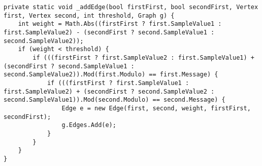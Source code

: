 \begin{lstlisting}[firstnumber=482,label=lst:newAddEdge, caption={The improved \lstinline|_addEdge| method.}]
private static void _addEdge(bool firstFirst, bool secondFirst, Vertex first, Vertex second, int threshold, Graph g) {
    int weight = Math.Abs((firstFirst ? first.SampleValue1 : first.SampleValue2) - (secondFirst ? second.SampleValue1 : second.SampleValue2));
    if (weight < threshold) {
        if (((firstFirst ? first.SampleValue2 : first.SampleValue1) + (secondFirst ? second.SampleValue1 : second.SampleValue2)).Mod(first.Modulo) == first.Message) {
            if (((firstFirst ? first.SampleValue1 : first.SampleValue2) + (secondFirst ? second.SampleValue2 : second.SampleValue1)).Mod(second.Modulo) == second.Message) {
                Edge e = new Edge(first, second, weight, firstFirst, secondFirst);
                g.Edges.Add(e);
            }
        }
    }
}
\end{lstlisting}

